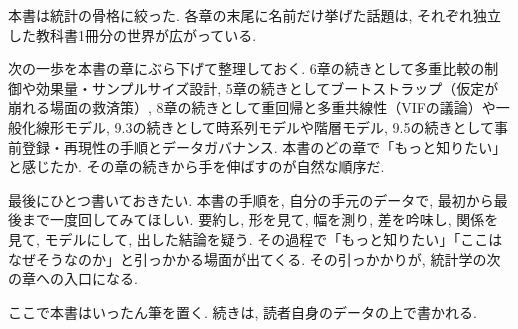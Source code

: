本書は統計の骨格に絞った.
各章の末尾に名前だけ挙げた話題は, それぞれ独立した教科書1冊分の世界が広がっている.

次の一歩を本書の章にぶら下げて整理しておく.
6章の続きとして多重比較の制御や効果量・サンプルサイズ設計, 5章の続きとしてブートストラップ（仮定が崩れる場面の救済策）, 8章の続きとして重回帰と多重共線性（VIFの議論）や一般化線形モデル, 9.3の続きとして時系列モデルや階層モデル, 9.5の続きとして事前登録・再現性の手順とデータガバナンス.
本書のどの章で「もっと知りたい」と感じたか. その章の続きから手を伸ばすのが自然な順序だ.

最後にひとつ書いておきたい.
本書の手順を, 自分の手元のデータで, 最初から最後まで一度回してみてほしい.
要約し, 形を見て, 幅を測り, 差を吟味し, 関係を見て, モデルにして, 出した結論を疑う.
その過程で「もっと知りたい」「ここはなぜそうなのか」と引っかかる場面が出てくる.
その引っかかりが, 統計学の次の章への入口になる.

ここで本書はいったん筆を置く. 続きは, 読者自身のデータの上で書かれる.
